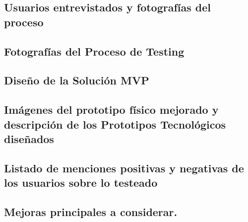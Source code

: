 \subsection{Usuarios entrevistados y fotografías del proceso}
\newpage
\subsection{Fotografías del Proceso de Testing}
\newpage
\subsection{Diseño de la Solución MVP}
\newpage
\subsection{Imágenes  del prototipo físico mejorado  y descripción de los Prototipos Tecnológicos diseñados }
\newpage
\subsection{Listado de menciones positivas y negativas de los usuarios sobre lo testeado}
\newpage
\subsection{Mejoras principales a considerar.}
